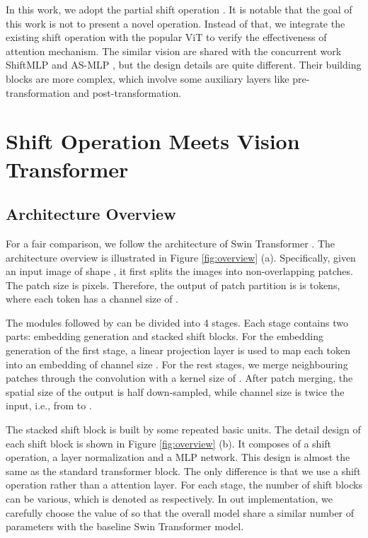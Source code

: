 \documentclass[letterpaper]{article} \usepackage{aaai22}  \usepackage{times}  \usepackage{helvet}  \usepackage{courier}  \usepackage[hyphens]{url}  \usepackage{graphicx} \usepackage{amsmath}
\begin{document}
In this work, we adopt the partial shift operation \cite{TSM}. It is notable that the goal of this work is not to present a novel operation. Instead of that, we integrate the existing shift operation with the popular ViT to verify the effectiveness of attention mechanism. The similar vision are shared with the concurrent work ShiftMLP \cite{ShiftMLP} and AS-MLP \cite{ASMLP}, but the design details are quite different. Their building blocks are more complex, which involve some auxiliary layers like pre-transformation and post-transformation.


\section{Shift Operation Meets Vision Transformer}

\subsection{Architecture Overview}

For a fair comparison, we follow the architecture of Swin Transformer \cite{Swin}. The architecture overview is illustrated in Figure \ref{fig:overview} (a). Specifically, given an input image of shape , it first splits the images into non-overlapping patches. The patch size is  pixels. Therefore, the output of patch partition is is  tokens, where each token has a channel size of . 

The modules followed by can be divided into 4 stages. Each stage contains two parts: embedding generation and stacked shift blocks. For the embedding generation of the first stage, a linear projection layer is used to map each token into an embedding of channel size . For the rest stages, we merge neighbouring patches through the convolution with a kernel size of . After patch merging, the spatial size of the output is half down-sampled, while channel size is twice the input, i.e., from  to .

The stacked shift block is built by some repeated basic units. The detail design of each shift block is shown in Figure \ref{fig:overview} (b). It composes of a shift operation, a layer normalization and a MLP network. This design is almost the same as the standard transformer block. The only difference is that we use a shift operation rather than a attention layer. For each stage, the number of shift blocks can be various, which is denoted as  respectively. In out implementation, we carefully choose the value of  so that the overall model share a similar number of parameters with the baseline Swin Transformer model.
\end{document}
